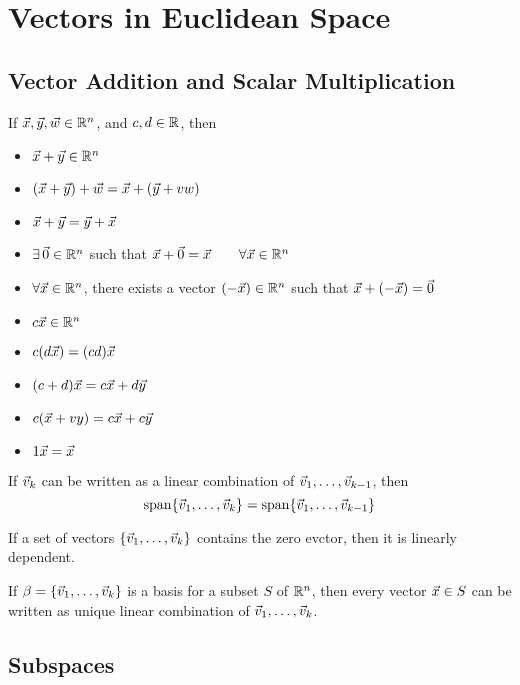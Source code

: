 \documentclass[english,12pt]{article}
\begin{document}
\notesheader

\section{Vectors in Euclidean Space}

\subsection{Vector Addition and Scalar Multiplication}

\begin{thrm}
If $\vec{x},\vec{y},\vec{w} \in {\mathbb{R}}^n$, and $c,d \in {\mathbb{R}}$, then
\begin{itemize}
\item $\vec{x} + \vec{y} \in {\mathbb{R}}^n$
\item $(\vec{x} + \vec{y}) + \vec{w} = \vec{x} + (\vec{y} + vw)$
\item $\vec{x} + \vec{y} = \vec{y} + \vec{x}$
\item $\exists\, \vec{0} \in {\mathbb{R}}^n$ such that $\vec{x} + \vec{0} = \vec{x}\qquad\forall \vec{x} \in {\mathbb{R}}^n$
\item $\forall \vec{x} \in {\mathbb{R}}^n$, there exists a vector $(- \vec{x}) \in {\mathbb{R}}^n$ such that $\vec{x} + (- \vec{x}) = \vec{0}$
\item $c \vec{x} \in {\mathbb{R}}^n$
\item $c (d \vec{x}) = (cd) \vec{x}$
\item $(c+d) \vec{x} = c \vec{x} + d \vec{y}$
\item $c (\vec{x} + vy) = c \vec{x} + c \vec{y}$
\item $1 \vec{x} = \vec{x}$
\end{itemize}
\end{thrm}

\begin{thrm}
If $\vec{v}_{k}$ can be written as a linear combination of $\vec{v}_{1},\dots,\vec{v}_{k-1}$, then
\[\operatorname{span}\{\vec{v}_{1},\dots,\vec{v}_{k}\} = \operatorname{span}\{\vec{v}_{1},\dots,\vec{v}_{k-1}\}\]
\end{thrm}

\begin{thrm}
If a set of vectors $\{\vec{v}_{1},\dots,\vec{v}_{k}\}$ contains the zero evctor, then it is linearly dependent.
\end{thrm}

\begin{thrm}
If $\beta= \{\vec{v}_{1},\dots,\vec{v}_{k}\}$ is a basis for a subset $S$ of ${\mathbb{R}}^n$, then every vector $\vec{x} \in S$ can be written as unique linear combination of $\vec{v}_{1},\dots,\vec{v}_{k}$.
\end{thrm}

\subsection{Subspaces}
\end{document}
